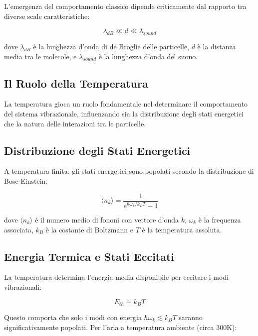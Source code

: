 \documentclass[a4paper,11pt]{article}
\begin{document}
L'emergenza del comportamento classico dipende criticamente dal rapporto
tra diverse scale caratteristiche:

\begin{equation}
\lambda_{dB} \ll d \ll \lambda_{sound}
\end{equation}


dove $\lambda_{dB}$ è la lunghezza d'onda di de Broglie delle
particelle, $d$ è la distanza media tra le molecole, e $\lambda_{sound}$
è la lunghezza d'onda del suono.

\subsection{Il Ruolo della Temperatura}

La temperatura gioca un ruolo fondamentale nel determinare il
comportamento del sistema vibrazionale, influenzando sia la
distribuzione degli stati energetici che la natura delle interazioni tra
le particelle.

\subsection{Distribuzione degli Stati Energetici}

A temperatura finita, gli stati energetici sono popolati secondo la
distribuzione di Bose-Einstein:

\begin{equation}
\langle n_k \rangle = \frac{1}{e^{\hbar\omega_k/k_BT} - 1}
\end{equation}


dove $\langle n_k \rangle$ è il numero medio di fononi con vettore
d'onda $k$, $\omega_k$ è la frequenza associata, $k_B$ è la costante di
Boltzmann e $T$ è la temperatura assoluta.

\subsection{Energia Termica e Stati Eccitati}

La temperatura determina l'energia media disponibile per eccitare i modi
vibrazionali:

\begin{equation}
E_{th} \sim k_BT
\end{equation}


Questo comporta che solo i modi con energia
$\hbar\omega_k \lesssim k_BT$ saranno significativamente popolati. Per
l'aria a temperatura ambiente (circa 300K):
\end{document}
